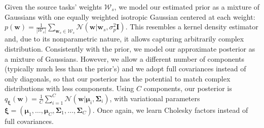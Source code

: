 \documentclass{article}
\newcommand{\abs}[1]{\left\lvert #1 \right\rvert}
\begin{document}
Given the source tasks' weights $\mathcal{W}_s$, we model our estimated prior as a mixture of Gaussians with one equally weighted isotropic Gaussian centered at each weight: $p(\bm{w}) = \frac{1}{\abs{\mathcal{W}_s}}\sum_{\bm{w}_s \in \mathcal{W}_s}\mathcal{N}(\bm{w}|\bm{w}_s,\sigma_p^2\bm{I})$. This resembles a kernel density estimator \cite{scott2015multivariate} and, due to its nonparametric nature, it allows capturing arbitrarily complex distribution. Consistently with the prior, we model our approximate posterior as a mixture of Gaussians. However, we allow a different number of components (typically much less than the prior's) and we adopt full covariances instead of only diagonals, so that our posterior has the potential to match complex distributions with less components. Using $C$ components, our posterior is $q_{\bm{\xi}}(\bm{w}) = \frac{1}{C}\sum_{i=1}^C\mathcal{N}(\bm{w}|\bm{\mu}_i,\bm{\Sigma}_i)$, with variational parameters $\bm{\xi} = (\bm{\mu}_1,\dots,\bm{\mu}_C,\bm{\Sigma}_1,\dots,\bm{\Sigma}_C)$. Once again, we learn Cholesky factors instead of full covariances.
\end{document}
